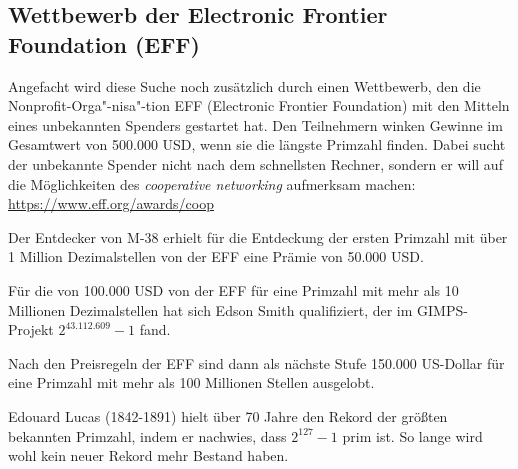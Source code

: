 \begin{refsegment}
\subsection{Wettbewerb der Electronic Frontier Foundation (EFF)}
Angefacht wird diese Suche noch zusätzlich durch einen Wettbewerb, den die
Non\-profit-Orga"-nisa"-tion EFF (Electronic Frontier Foundation) mit den
Mitteln eines unbekannten Spenders gestartet hat. Den Teilnehmern winken
Gewinne im Gesamtwert von 500.000 USD, wenn sie die längste Primzahl
finden. Dabei sucht der unbekannte Spender nicht nach dem schnellsten Rechner,
sondern er will auf die Möglichkeiten des {\em cooperative networking}
aufmerksam machen: \\
{\url{https://www.eff.org/awards/coop}}

Der Entdecker von M-38 erhielt für die Entdeckung der ersten Primzahl
mit über 1 Million Dezimalstellen von der EFF eine Prämie von 50.000 USD.

Für die von 100.000 USD von der EFF für eine Primzahl mit mehr als
10 Millionen Dezimalstellen hat sich Edson Smith qualifiziert, der
im GIMPS-Projekt $ 2^{43.112.609}-1 $ fand.

Nach den Preisregeln der EFF sind dann als nächste Stufe 150.000 US-Dollar
für eine Primzahl mit mehr als 100 Millionen Stellen ausgelobt.


Edouard Lucas (1842-1891) hielt über 70 Jahre den
Rekord der größten bekannten Primzahl, indem er nachwies, dass
$2^{127}-1$ prim ist. So lange wird wohl kein neuer Rekord mehr Bestand haben.



\end{refsegment}
